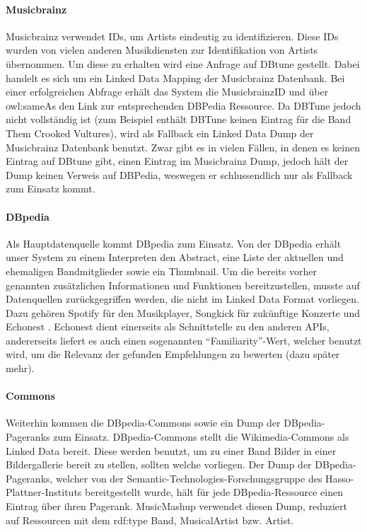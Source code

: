 \paragraph{Musicbrainz} Musicbrainz verwendet IDs, um Artists eindeutig zu identifizieren. Diese IDs wurden von vielen anderen Musikdiensten zur Identifikation von Artists übernommen. Um diese zu erhalten wird eine Anfrage auf DBtune \cite{dbtune} gestellt. Dabei handelt es sich um ein Linked Data Mapping der Musicbrainz Datenbank. Bei einer erfolgreichen Abfrage erhält das System die MusicbrainzID und über owl:sameAs den Link zur entsprechenden DBPedia Ressource. Da DBTune jedoch nicht vollständig ist (zum Beispiel enthält DBTune keinen Eintrag für die Band \glqq Them Crooked Vultures\grqq), wird als Fallback ein Linked Data Dump der Musicbrainz Datenbank benutzt. Zwar gibt es in vielen Fällen, in denen es keinen Eintrag auf DBtune gibt, einen Eintrag im Musicbrainz Dump, jedoch hält der Dump keinen Verweis auf DBPedia, weswegen er schlussendlich nur als Fallback zum Einsatz kommt. %

\paragraph{DBpedia} Als Hauptdatenquelle kommt DBpedia zum Einsatz. Von der DBpedia erhält unser System zu einem Interpreten den Abstract, eine Liste der aktuellen und ehemaligen Bandmitglieder sowie ein Thumbnail. Um die bereits vorher genannten zusätzlichen Informationen und Funktionen bereitzustellen, musste auf Datenquellen zurückgegriffen werden, die nicht im Linked Data Format vorliegen. Dazu gehören Spotify \cite{spotify} für den Musikplayer, Songkick \cite{songkick_api} für zukünftige Konzerte und Echonest \cite{echonest_api}. Echonest dient einerseits als Schnittstelle zu den anderen APIs, andererseits liefert es auch einen sogenannten “Familiarity”-Wert, welcher benutzt wird, um die Relevanz der gefunden Empfehlungen zu bewerten (dazu später mehr).

\paragraph{Commons} Weiterhin kommen die DBpedia-Commons \cite{dbpedia_commons} sowie ein Dump der DBpedia-Pageranks \cite{dbpedia-graphmeasures} zum Einsatz. DBpedia-Commons stellt die Wikimedia-Commons als Linked Data bereit. Diese werden benutzt, um zu einer Band Bilder in einer Bildergallerie bereit zu stellen, sollten welche vorliegen. 
Der Dump der DBpedia-Pageranks, welcher von der Semantic-Technologies-Forschungsgruppe des Hasso-Plattner-Instituts bereitgestellt wurde, hält für jede DBpedia-Ressource einen Eintrag über ihren Pagerank. MusicMashup verwendet diesen Dump, reduziert auf Ressourcen mit dem rdf:type Band, MusicalArtist bzw. Artist.

